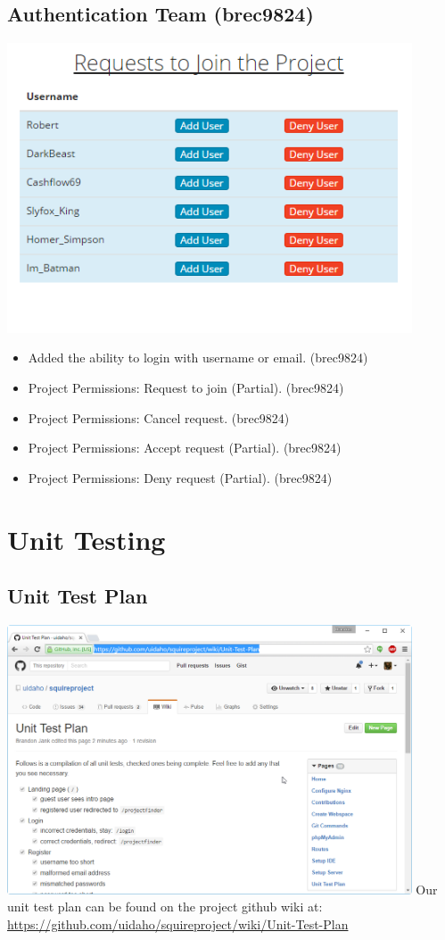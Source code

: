\documentclass[11pt]{report}
\begin{document}
\section{Authentication Team (brec9824)}
    \includegraphics[width=0.9\textwidth]{images/auth}
    \begin{itemize}
        \item Added the ability to login with username or email. (brec9824)
        \item Project Permissions: Request to join (Partial). (brec9824)
        \item Project Permissions: Cancel request. (brec9824)
        \item Project Permissions: Accept request (Partial). (brec9824)
        \item Project Permissions: Deny request (Partial). (brec9824)
    \end{itemize}

\chapter{Unit Testing}
\section{Unit Test Plan}
    \includegraphics[width=0.9\textwidth]{images/testplan}
    Our unit test plan can be found on the project github wiki at: \url{https://github.com/uidaho/squireproject/wiki/Unit-Test-Plan}
\end{document}
